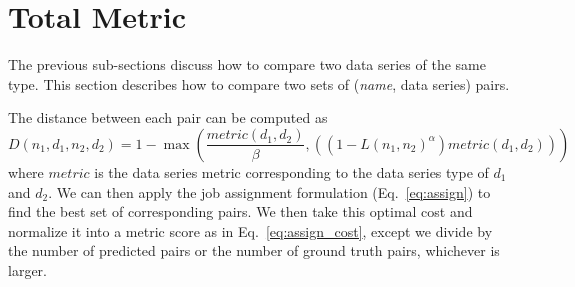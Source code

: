 \documentclass[a4paper,11pt]{scrartcl}
\begin{document}
\section{Total Metric}

The previous sub-sections discuss how to compare two data series of the same type.
This section describes how to compare two sets of (\emph{name}, data series) pairs.

The distance between each pair can be computed as
\begin{equation}
D(n_1, d_1, n_2, d_2) = 1 - \max(\frac{metric(d_1, d_2)}{\beta}, ((1 - L(n_1, n_2)^\alpha)metric(d_1, d_2)))
\end{equation}
where $metric$ is the data series metric corresponding to the data series type of $d_1$ and $d_2$.
We can then apply the job assignment formulation (Eq.~\ref{eq:assign}) to find the best set of corresponding pairs.
We then take this optimal cost and normalize it into a metric score as in Eq.~\ref{eq:assign_cost}, except we divide by the number of predicted pairs or the number of ground truth pairs, whichever is larger.
\end{document}
